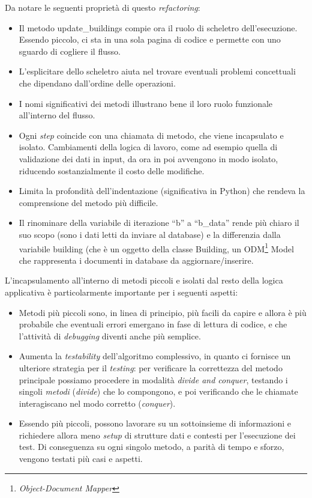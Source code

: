 \documentclass[12pt]{report}
\begin{document}
Da notare le seguenti proprietà di questo \textit{refactoring}:
\begin{itemize}
  \item Il metodo update\_buildings compie ora il ruolo
  di scheletro dell'esecuzione. Essendo piccolo, ci sta in una sola
  pagina di codice e permette con uno sguardo di cogliere il flusso.
  \item L'esplicitare dello scheletro aiuta nel trovare
   eventuali problemi concettuali che dipendano dall'ordine
   delle operazioni.
  \item I nomi significativi dei metodi illustrano bene il loro 
  ruolo funzionale all'interno del flusso. 
  \item Ogni \textit{step} coincide con una chiamata di metodo, 
  che viene incapsulato e isolato. Cambiamenti della logica di
  lavoro, come ad esempio quella di validazione dei dati in input,
  da ora in poi avvengono in modo isolato, riducendo
  sostanzialmente il costo delle modifiche.
  \item Limita la profondità dell'indentazione (significativa in Python) 
  che rendeva la comprensione del metodo più difficile.
  \item Il rinominare della variabile di iterazione ``b'' a ``b\_data'' rende
  più chiaro il suo scopo (sono i dati letti da inviare al database) 
  e la differenzia dalla variabile building (che è un oggetto della
  classe Building, un ODM\footnote{\textit{Object-Document Mapper}} Model che
  rappresenta i documenti in database da aggiornare/inserire. 
\end{itemize}

L'incapsulamento all'interno di metodi piccoli e isolati dal resto della
logica applicativa è particolarmente importante per i seguenti aspetti:

\begin{itemize}
  \item Metodi più piccoli sono, in linea di principio, più facili 
  da capire e allora è più probabile 
  che eventuali errori emergano in fase di lettura di codice,
  e che l'attività di \textit{debugging} diventi anche più semplice.
  \item Aumenta la \textit{testability} dell'algoritmo complessivo, in quanto
  ci fornisce un ulteriore strategia per il \textit{testing}: 
  per verificare la correttezza del metodo principale 
  possiamo procedere in modalità \textit{divide and conquer}, 
  testando i singoli \textit{metodi} (\textit{divide}) 
  che lo compongono, e poi verificando che le
  chiamate interagiscano nel modo corretto (\textit{conquer}).
  \item Essendo più piccoli, possono lavorare su un sottoinsieme 
  di informazioni e richiedere allora meno \textit{setup} 
  di strutture dati e contesti per l'esecuzione dei test. Di conseguenza
  su ogni singolo metodo, a parità di tempo e sforzo, vengono testati
  più casi e aspetti.
\end{itemize}
\end{document}
